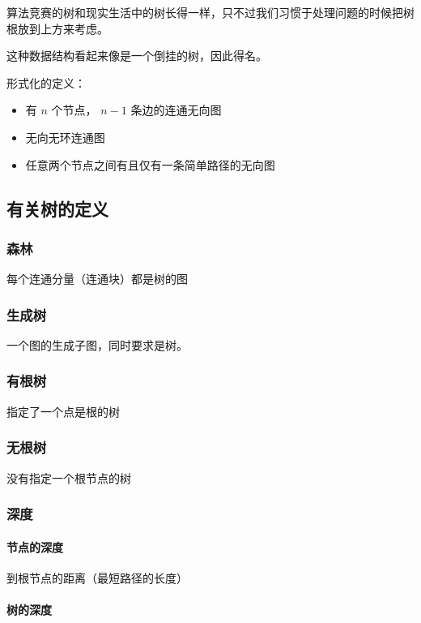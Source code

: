
算法竞赛的树和现实生活中的树长得一样，只不过我们习惯于处理问题的时候把树根放到上方来考虑。

这种数据结构看起来像是一个倒挂的树，因此得名。

形式化的定义：

\begin{itemize}
\item 有 $n$ 个节点， $n-1$ 条边的连通无向图
\item 无向无环连通图
\item 任意两个节点之间有且仅有一条简单路径的无向图
\end{itemize}

\subsection{有关树的定义}

\subsubsection{森林}

每个连通分量（连通块）都是树的图

\subsubsection{生成树}

一个图的生成子图，同时要求是树。

\subsubsection{有根树}

指定了一个点是根的树

\subsubsection{无根树}

没有指定一个根节点的树

\subsubsection{深度}

\paragraph{节点的深度}

到根节点的距离（最短路径的长度）

\paragraph{树的深度}

